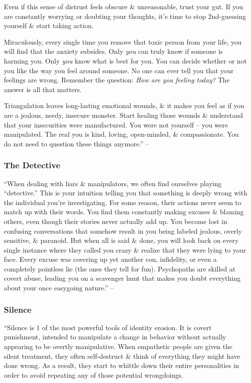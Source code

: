 \documentclass{article}
\numberwithin{equation}{section}
\begin{document}
Even if this sense of distrust feels obscure \& unreasonable, trust your gut. If you are constantly worrying or doubting your thoughts, it's time to stop 2nd-guessing yourself \& start taking action.

Miraculously, every single time you remove that toxic person from your life, you will find that the anxiety subsides. Only \textit{you} can truly know if someone is harming you. Only \textit{you} know what is best for you. You can decide whether or not you like the way you feel around someone. No one can ever tell you that your feelings are wrong. Remember the question: \textit{How are you feeling today?} The answer is all that matters.

Triangulation leaves long-lasting emotional wounds, \& it makes you feel as if you are a jealous, needy, insecure monster. Start healing those wounds \& understand that your insecurities were manufactured. You were not yourself -- you were manipulated. The real you is kind, loving, open-minded, \& compassionate. You do not need to question these things anymore.'' -- \cite[pp. 61--68]{MacKenzie2015}

\subsubsection{The Detective}
``When dealing with liars \& manipulators, we often find ourselves playing ``detective.'' This is your intuition telling you that something is deeply wrong with the individual you're investigating. For some reason, their actions never seem to match up with their words. You find them constantly making excuses \& blaming others, even though their stories never actually add up. You become lost in confusing conversations that somehow result in you being labeled jealous, overly sensitive, \& paranoid. But when all is said \& done, you will look back on every single instance where they called you crazy \& realize that they were lying to your face. Every excuse was covering up yet another con, infidelity, or even a completely pointless lie (the ones they tell for fun). Psychopaths are skilled at covert abuse, leading you on a scavenger hunt that makes you doubt everything about your once easygoing nature.'' -- \cite[p. 69]{MacKenzie2015}

\subsubsection{Silence}
``Silence is 1 of the most powerful tools of identity erosion. It is covert punishment, intended to manipulate a change in behavior without actually appearing to be overtly manipulative. When empathetic people are given the silent treatment, they often self-destruct \& think of everything they might have done wrong. As a result, they start to whittle down their entire personalities in order to avoid repeating any of those potential wrongdoings.
\end{document}
